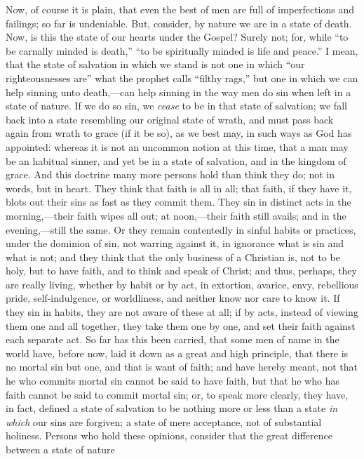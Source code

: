 Now, of course it is plain, that even the best of men are full of
imperfections and failings; so far is undeniable. But, consider, by
nature we are in a state of death. Now, is this the state of our
hearts under the Gospel? Surely not; for, while ``to be carnally
minded is death,'' ``to be spiritually minded is life and
peace.'' I mean, that the state of salvation in which we stand is
not one in which ``our righteousnesses are'' what the prophet
calls ``filthy rags,'' but one in which we can help sinning
unto death,—can help sinning in the way men do sin when left in a
state of nature. If we do so sin, we \emph{cease} to be in that state
of salvation; we fall back into a state resembling our original state
of wrath, and must pass back again from wrath to grace (if it be so),
as we best may, in such ways as God has appointed: whereas it is not
an uncommon notion at this time, that a man may be an habitual sinner,
and yet be in a state of salvation, and in the kingdom of grace. And
this doctrine many more persons hold than think they do; not in words,
but in heart. They think that faith is all in all; that faith, if they
have it, blots out their sins as fast as they commit them. They sin in
distinct acts in the morning,—their faith wipes all out; at noon,—their
faith still avails; and in the evening,—still the same. Or they
remain contentedly in sinful habits or practices, under the dominion
of sin, not warring against it, in ignorance what is sin and what is
not; and they think that the only business of a Christian is, not to
be holy, but to have faith, and to think and speak of Christ; and
thus, perhaps, they are really living, whether by habit or by act, in
extortion, avarice, envy, rebellious pride, self-indulgence, or
worldliness, and neither know nor care to know it. If they sin in
habits, they are not aware of these at all; if by acts, instead of
viewing them one and all together, they take them one by one, and set
their faith against each separate act. So far has this been carried,
that some men of name in the world have, before now, laid it down as a
great and high principle, that there is no mortal sin but one, and
that is want of faith; and have hereby meant, not that he who commits
mortal sin cannot be said to have faith, but that he who has faith
cannot be said to commit mortal sin; or, to speak more clearly, they
have, in fact, defined a state of salvation to be nothing more or less
than a state \emph{in which} our sins are forgiven; a state of mere
acceptance, not of substantial holiness. Persons who hold these
opinions, consider that the great difference between a state of nature
